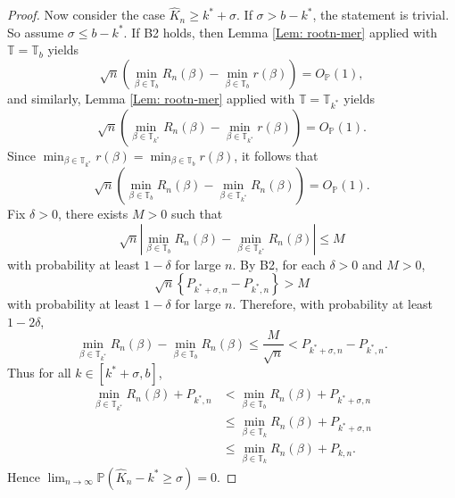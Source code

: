 \documentclass[12pt]{article}
\theoremstyle{remark}
\theoremstyle{plain}
\begin{document}
\begin{proof}
Now consider the case $\hat{K}_{n}\ge k^{*}+\sigma$. If $\sigma>b-k^{*}$,
the statement is trivial. So assume $\sigma\le b-k^{*}$. If B2 holds,
then Lemma \ref{Lem: rootn-mer} applied with $\mathbb{T}=\mathbb{T}_{b}$ yields
\[
\sqrt{n}\left(\min_{\beta\in\mathbb{T}_{b}}R_{n}(\beta)-\min_{\beta\in\mathbb{T}_{b}}r(\beta)\right)=O_{\mathbb{P}}(1),
\]
and similarly, Lemma \ref{Lem: rootn-mer} applied with $\mathbb{T}=\mathbb{T}_{k^{*}}$ yields
\[
\sqrt{n}\left(\min_{\beta\in\mathbb{T}_{k^{*}}}R_{n}(\beta)-\min_{\beta\in\mathbb{T}_{k^{*}}}r(\beta)\right)=O_{\mathbb{P}}(1).
\]
Since $\min_{\beta\in\mathbb{T}_{k^{*}}}r(\beta)=\min_{\beta\in\mathbb{T}_{b}}r(\beta)$,
it follows that
\[
\sqrt{n}\left(\min_{\beta\in\mathbb{T}_{b}}R_{n}(\beta)-\min_{\beta\in\mathbb{T}_{k^{*}}}R_{n}(\beta)\right)=O_{\mathbb{P}}(1).
\]
Fix $\delta>0$, there exists $M>0$ such that
\[
\sqrt{n}\left|\min_{\beta\in\mathbb{T}_{b}}R_{n}(\beta)-\min_{\beta\in\mathbb{T}_{k^{*}}}R_{n}(\beta)\right|\le M
\]
with probability at least $1-\delta$ for large $n$. By B2, for each
$\delta>0$ and $M>0$,
\[
\sqrt{n}\left\{ P_{k^{*}+\sigma,n}-P_{k^{*},n}\right\} >M
\]
with probability at least $1-\delta$ for large $n$. Therefore, with
probability at least $1-2\delta$,
\[
\min_{\beta\in\mathbb{T}_{k^{*}}}R_{n}(\beta)-\min_{\beta\in\mathbb{T}_{b}}R_{n}(\beta)\le\frac{M}{\sqrt{n}}<P_{k^{*}+\sigma,n}-P_{k^{*},n}.
\]
Thus for all $k\in\left[k^{*}+\sigma,b\right]$,
\begin{align*}
\min_{\beta\in\mathbb{T}_{k^{*}}}R_{n}(\beta)+P_{k^{*},n} & <\min_{\beta\in\mathbb{T}_{b}}R_{n}(\beta)+P_{k^{*}+\sigma,n}\\
 & \le\min_{\beta\in\mathbb{T}_{k}}R_{n}(\beta)+P_{k^{*}+\sigma,n}\\
 & \le\min_{\beta\in\mathbb{T}_{k}}R_{n}(\beta)+P_{k,n}.
\end{align*}
Hence $\lim_{n\to\infty}\mathbb{P}\left(\hat{K}_{n}-k^{*}\ge\sigma\right)=0$.


\end{proof}
\end{document}
